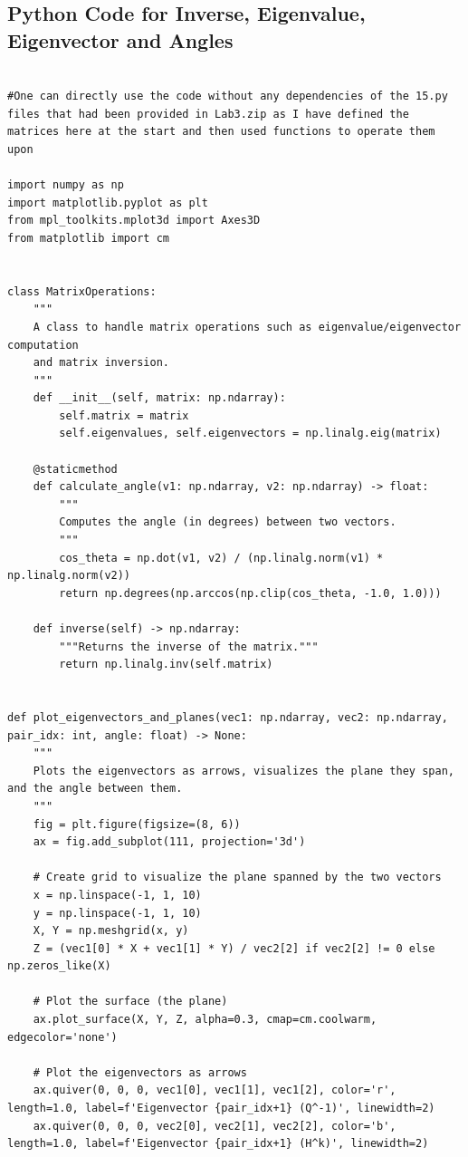 \documentclass{article}
\begin{document}
\subsection{Python Code for Inverse, Eigenvalue, Eigenvector and Angles}
\begin{lstlisting}

#One can directly use the code without any dependencies of the 15.py files that had been provided in Lab3.zip as I have defined the matrices here at the start and then used functions to operate them upon

import numpy as np
import matplotlib.pyplot as plt
from mpl_toolkits.mplot3d import Axes3D
from matplotlib import cm


class MatrixOperations:
    """
    A class to handle matrix operations such as eigenvalue/eigenvector computation
    and matrix inversion.
    """
    def __init__(self, matrix: np.ndarray):
        self.matrix = matrix
        self.eigenvalues, self.eigenvectors = np.linalg.eig(matrix)

    @staticmethod
    def calculate_angle(v1: np.ndarray, v2: np.ndarray) -> float:
        """
        Computes the angle (in degrees) between two vectors.
        """
        cos_theta = np.dot(v1, v2) / (np.linalg.norm(v1) * np.linalg.norm(v2))
        return np.degrees(np.arccos(np.clip(cos_theta, -1.0, 1.0)))

    def inverse(self) -> np.ndarray:
        """Returns the inverse of the matrix."""
        return np.linalg.inv(self.matrix)


def plot_eigenvectors_and_planes(vec1: np.ndarray, vec2: np.ndarray, pair_idx: int, angle: float) -> None:
    """
    Plots the eigenvectors as arrows, visualizes the plane they span, and the angle between them.
    """
    fig = plt.figure(figsize=(8, 6))
    ax = fig.add_subplot(111, projection='3d')

    # Create grid to visualize the plane spanned by the two vectors
    x = np.linspace(-1, 1, 10)
    y = np.linspace(-1, 1, 10)
    X, Y = np.meshgrid(x, y)
    Z = (vec1[0] * X + vec1[1] * Y) / vec2[2] if vec2[2] != 0 else np.zeros_like(X)

    # Plot the surface (the plane)
    ax.plot_surface(X, Y, Z, alpha=0.3, cmap=cm.coolwarm, edgecolor='none')

    # Plot the eigenvectors as arrows
    ax.quiver(0, 0, 0, vec1[0], vec1[1], vec1[2], color='r', length=1.0, label=f'Eigenvector {pair_idx+1} (Q^-1)', linewidth=2)
    ax.quiver(0, 0, 0, vec2[0], vec2[1], vec2[2], color='b', length=1.0, label=f'Eigenvector {pair_idx+1} (H^k)', linewidth=2)


\end{lstlisting}
\end{document}
